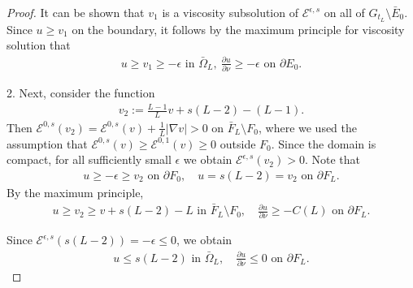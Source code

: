 \documentclass[10pt,a4paper]{amsart}
\begin{document}
\begin{proof}
	It can be shown that $v_1$ is a viscosity subsolution of $\mathcal{E}^{\epsilon ,s}$ on all of $G_{t_L}\setminus \bar{E}_0$. Since $u \geq v_1$ on the boundary, it follows by the maximum principle for viscosity solution that 
	\begin{align}\label{v1-lower}
		u \geq v_1 \geq -\epsilon \text{ in } \bar{\Omega }_{L},\ \frac{\partial u}{\partial \nu } \geq - \epsilon \text{ on }\partial E_0.
	\end{align} 

2. Next, consider the function
\begin{align*}
	v_2:= \frac{L-1}{L} v + s(L-2) - (L-1).
\end{align*} 
Then $\mathcal{E}^{0,s}(v_2) = \mathcal{E}^{0,s}(v) + \frac{1}{L}|\nabla v| >0$ on $\bar{F}_{L} \setminus F_0$, where we used the assumption that $\mathcal{E}^{0,s}(v) \geq \mathcal{E}^{0,1}(v) \geq 0$ outside $F_0$. Since the domain is compact, for all sufficiently small $\epsilon $ we obtain $\mathcal{E}^{\epsilon ,s}(v_2) >0$. Note that
\begin{align*}
	u \geq - \epsilon \geq v_2 \text{ on } \partial F_0,\quad u= s(L-2) = v_2 \text{ on } \partial F_L.
\end{align*} 
By the maximum principle, 
\begin{align}\label{v2-lower}
	u \geq v_2 \geq v+ s(L-2) - L \text{ in } \bar{F}_{L}\setminus F_0,\quad \frac{\partial u}{\partial \nu } \geq - C(L) \text{ on } \partial F_L.
\end{align}

Since $\mathcal{E}^{\epsilon ,s}(s(L-2) ) = - \epsilon \leq 0$, we obtain
\begin{align}
	u \leq s(L-2) \text{ in } \bar{\Omega }_{L},\quad \frac{\partial u}{\partial \nu } \leq 0 \text{ on } \partial F_{L}.
\end{align}


\end{proof}
\end{document}
